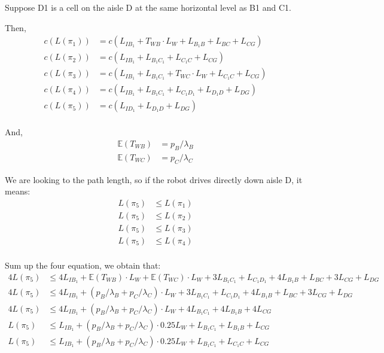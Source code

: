 \documentclass{article}
\begin{document}
Suppose D1 is a cell on the aisle D at the same horizontal level as B1 and C1.

Then,
\begin{align*}
c(L(\pi_{1})) &= c(L_{IB_{1}} + T_{WB} \cdot L_{W} + L_{B_{1}B} + L_{BC} + L_{CG})\\
c(L(\pi_{2})) &= c(L_{IB_{1}} +  L_{B_{1}C_{1}} + L_{C_{1}C} + L_{CG}) \\
c(L(\pi_{3})) &= c(L_{IB_{1}} +  L_{B_{1}C_{1}} + T_{WC} \cdot L_{W}  + L_{C_{1}C} + L_{CG}) \\
c(L(\pi_{4})) &= c(L_{IB_{1}} +  L_{B_{1}C_{1}} +  L_{C_{1}D_{1}} + L_{D_{1}D} + L_{DG}) \\
c(L(\pi_{5})) &= c(L_{ID_{1}} +  L_{D_{1}D} + L_{DG}) \\
\end{align*}

And,
\begin{align*}
\mathbb{E}(T_{WB}) &=  p_{B} / \lambda_{B} \\
\mathbb{E}(T_{WC}) &=  p_{C} / \lambda_{C}
\end{align*}

We are looking to the path length, so if the robot drives directly down aisle D, it means:
\begin{align}
L(\pi_{5}) &\leq L(\pi_{1}) \\
L(\pi_{5}) &\leq L(\pi_{2}) \\
L(\pi_{5}) &\leq L(\pi_{3}) \\
L(\pi_{5}) &\leq L(\pi_{4}) \\
\end{align}

Sum up the four equation, we obtain that:
\begin{align*}
4 L(\pi_{5}) &\leq 4L_{IB_{1}}  + \mathbb{E}(T_{WB}) \cdot L_{W} +  \mathbb{E}(T_{WC}) \cdot L_{W}  
			+ 3 L_{B_{1}C_{1}} + L_{C_{1}D_{1}} + 4 L_{B_{1}B} 
			+ L_{BC} + 3L_{CG} + L_{DG} \\
4 L(\pi_{5}) &\leq 4L_{IB_{1}}  + (p_{B} / \lambda_{B}   +  p_{C} / \lambda_{C}) \cdot L_{W}  
			+ 3 L_{B_{1}C_{1}} + L_{C_{1}D_{1}} + 4 L_{B_{1}B} 
			+ L_{BC} + 3L_{CG} + L_{DG} \\
4 L(\pi_{5}) &\leq 4L_{IB_{1}}  + (p_{B} / \lambda_{B}   +  p_{C} / \lambda_{C}) \cdot L_{W}  
			+ 4 L_{B_{1}C_{1}} + 4 L_{B_{1}B} 
			+ 4L_{CG} \\
L(\pi_{5}) &\leq L_{IB_{1}}  + (p_{B} / \lambda_{B}   +  p_{C} / \lambda_{C}) \cdot 0.25L_{W}  
			+ L_{B_{1}C_{1}} + L_{B_{1}B} 
			+ L_{CG} \\
L(\pi_{5}) &\leq L_{IB_{1}}  + (p_{B} / \lambda_{B}   +  p_{C} / \lambda_{C}) \cdot 0.25L_{W}  
			+ L_{B_{1}C_{1}} + L_{C_{1}C} 
			+ L_{CG} \\
\end{align*}
\end{document}
